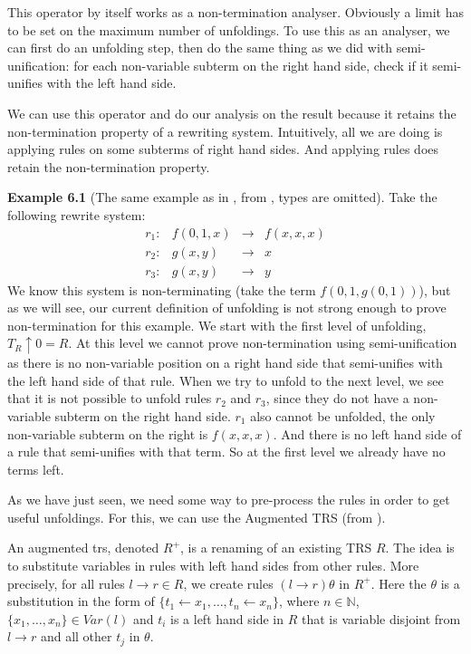 This operator by itself works as a non-termination analyser. Obviously a limit has to be set on the maximum number of unfoldings. To use this as an analyser, we can first do an unfolding step, then do the same thing as we did with semi-unification: for each non-variable subterm on the right hand side, check if it semi-unifies with the left hand side. 

We can use this operator and do our analysis on the result because it retains the non-termination property of a rewriting system. Intuitively, all we are doing is applying rules on some subterms of right hand sides. And applying rules does retain the non-termination property. 

\textbf{Example 6.1} (The same example as in \cite{Payet:Unfolding}, from \cite{TOYAMA1987141}, types are omitted). Take the following rewrite system: 
\[
\begin{array}{lrcl}
    r_1: & f(0, 1, x) & \rightarrow & f(x, x, x) \\
    r_2: & g(x, y) & \rightarrow & x \\
    r_3: & g(x, y) & \rightarrow & y
\end{array}
\]
We know this system is non-terminating (take the term $f(0, 1, g(0, 1))$), but as we will see, our current definition of unfolding is not strong enough to prove non-termination for this example. We start with the first level of unfolding, $T_R \uparrow 0 = R$. At this level we cannot prove non-termination using semi-unification as there is no non-variable position on a right hand side that semi-unifies with the left hand side of that rule. When we try to unfold to the next level, we see that it is not possible to unfold rules $r_2$ and $r_3$, since they do not have a non-variable subterm on the right hand side. $r_1$ also cannot be unfolded, the only non-variable subterm on the right is $f(x, x, x)$. And there is no left hand side of a rule that semi-unifies with that term. So at the first level we already have no terms left.  

As we have just seen, we need some way to pre-process the rules in order to get useful unfoldings. For this, we can use the Augmented TRS (from \cite{Payet:Unfolding}).  

An augmented trs, denoted $R^+$, is a renaming of an existing TRS $R$. The idea is to substitute variables in rules with left hand sides from other rules. More precisely, for all rules $l \rightarrow r \in R$, we create rules $(l \rightarrow r)\theta$ in $R^+$. Here the $\theta$ is a substitution in the form of $\{ t_1 \leftarrow x_1, \dots, t_n \leftarrow x_n \}$, where $n \in \mathbb{N}$, $\{ x_1, \dots, x_n \} \in \textit{Var}(l)$ and $t_i$ is a left hand side in $R$ that is variable disjoint from $l \rightarrow r$ and all other $t_j$ in $\theta$. 

